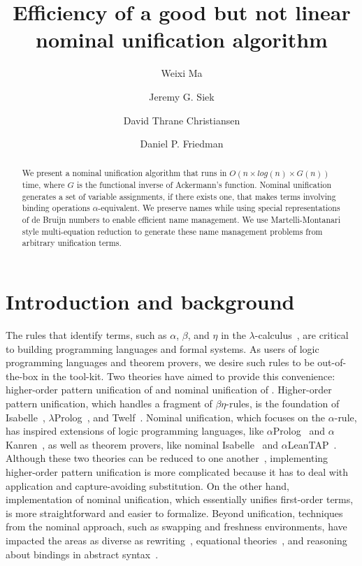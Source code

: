\documentclass[a4paper,UKenglish]{lipics-v2016}
\title{Efficiency of a good but not linear nominal unification algorithm}
\author[1]{Weixi Ma}
\author[2]{Jeremy G. Siek}
\author[3]{David Thrane Christiansen}
\author[4]{Daniel P. Friedman}
\affil[1]{Indiana University,
  \texttt{mvc@iu.edu}}
\affil[2]{Indiana University,
  \texttt{jsiek@indiana.edu}}
\affil[3]{Galois, Inc.,
  \texttt{dtc@galois.com}}
\affil[4]{Indiana University,
  \texttt{dfried@indiana.edu}}
\begin{document}
\maketitle

\begin{abstract}
  We present a nominal unification algorithm that runs in $O(n \times
  log(n) \times G(n))$ time, where $G$ is the functional inverse of
  Ackermann's function.  Nominal unification generates a set of
  variable assignments, if there exists one, that makes terms
  involving binding operations $\alpha$-equivalent. We preserve names
  while using special representations of de Bruijn numbers
  to enable efficient name management.
  We use Martelli-Montanari style multi-equation reduction
  to generate these name management problems from arbitrary unification terms.
\end{abstract}

\section{Introduction and background}

The rules that identify terms, such as $\alpha$, $\beta$, and $\eta$
in the $\lambda$-calculus~\citep{church_calculi_1941}, are critical to
building programming languages and formal systems.  As users of logic
programming languages and theorem provers, we desire such rules to be
out-of-the-box in the tool-kit.  Two theories have aimed to provide
this convenience: higher-order pattern unification of
\citet{miller_logic_1989} and nominal unification of
\citet{urban_nominal_2004}.  Higher-order pattern unification, which
handles a fragment of $\beta\eta$-rules, is the foundation of
Isabelle~\citep{paulson_natural_1986},
$\lambda$Prolog~\citep{nadathur_overview_1988}, and
Twelf~\citep{pfenning_system_1999}.  Nominal unification, which
focuses on the $\alpha$-rule, has inspired extensions of logic
programming languages, like $\alpha$Prolog~\citep{cheney_prolog:_2004}
and $\alpha$Kanren~\citep{byrd_kanren_2007}, as well as theorem
provers, like nominal Isabelle~\citep{urban_nominal_2005} and
$\alpha$LeanTAP~\citep{near_leantap:_2008}.  Although these two
theories can be reduced to one another~\citep{cheney_relating_2005,
  levy_nominal_2012}, implementing higher-order pattern unification is
more complicated because it has to deal with application and
capture-avoiding substitution.  On the other hand, implementation of
nominal unification, which essentially unifies first-order terms, is
more straightforward and easier to formalize.  Beyond unification,
techniques from the nominal approach, such as swapping and freshness
environments, have impacted the areas as diverse as
rewriting~\citep{fernandez_nominal_2004, fernandez_nominal_2005,
  fernandez_nominal_2007, aoto_nominal_2016}, equational
theories~\citep{ayala-rincon_nominal_2016}, and reasoning about
bindings in abstract syntax~\citep{pitts_metalanguage_2000,
  gabbay_new_2002}.
\end{document}
